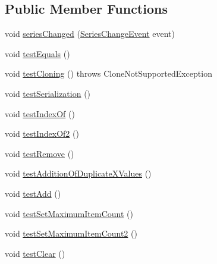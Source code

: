 \subsection*{Public Member Functions}
\begin{DoxyCompactItemize}
\item 
void \mbox{\hyperlink{classorg_1_1jfree_1_1data_1_1xy_1_1_y_interval_series_test_a03898d82f545814b3026e56a0d455747}{series\+Changed}} (\mbox{\hyperlink{classorg_1_1jfree_1_1data_1_1general_1_1_series_change_event}{Series\+Change\+Event}} event)
\item 
void \mbox{\hyperlink{classorg_1_1jfree_1_1data_1_1xy_1_1_y_interval_series_test_a6d078fa17ae7914cb3751bc85b17fe74}{test\+Equals}} ()
\item 
void \mbox{\hyperlink{classorg_1_1jfree_1_1data_1_1xy_1_1_y_interval_series_test_a5cc80bf1bc317bddad148d9c81d24835}{test\+Cloning}} ()  throws Clone\+Not\+Supported\+Exception 
\item 
void \mbox{\hyperlink{classorg_1_1jfree_1_1data_1_1xy_1_1_y_interval_series_test_a3c221d95657e37889724f78f82488b6d}{test\+Serialization}} ()
\item 
void \mbox{\hyperlink{classorg_1_1jfree_1_1data_1_1xy_1_1_y_interval_series_test_a49f7b74ebd5c43c876b1c634a8cdc1b1}{test\+Index\+Of}} ()
\item 
void \mbox{\hyperlink{classorg_1_1jfree_1_1data_1_1xy_1_1_y_interval_series_test_abb2ebf2779d9d2ce89193fa7d9d413b4}{test\+Index\+Of2}} ()
\item 
void \mbox{\hyperlink{classorg_1_1jfree_1_1data_1_1xy_1_1_y_interval_series_test_a9ed54b2eb31c4daa8ba48e30896a2713}{test\+Remove}} ()
\item 
void \mbox{\hyperlink{classorg_1_1jfree_1_1data_1_1xy_1_1_y_interval_series_test_ad0e355a7f8d785ca124ec2a6d5e29eaa}{test\+Addition\+Of\+Duplicate\+X\+Values}} ()
\item 
void \mbox{\hyperlink{classorg_1_1jfree_1_1data_1_1xy_1_1_y_interval_series_test_a6eb1923ff99ebe6783e82d5eb4020f6f}{test\+Add}} ()
\item 
void \mbox{\hyperlink{classorg_1_1jfree_1_1data_1_1xy_1_1_y_interval_series_test_a73ca647ad8fea178aed873b3f267e49f}{test\+Set\+Maximum\+Item\+Count}} ()
\item 
void \mbox{\hyperlink{classorg_1_1jfree_1_1data_1_1xy_1_1_y_interval_series_test_a04911371151ba646ac1d0e7060f6da1c}{test\+Set\+Maximum\+Item\+Count2}} ()
\item 
void \mbox{\hyperlink{classorg_1_1jfree_1_1data_1_1xy_1_1_y_interval_series_test_a91c3527cd6b7f24d9c557fd01239f1cc}{test\+Clear}} ()
\end{DoxyCompactItemize}


